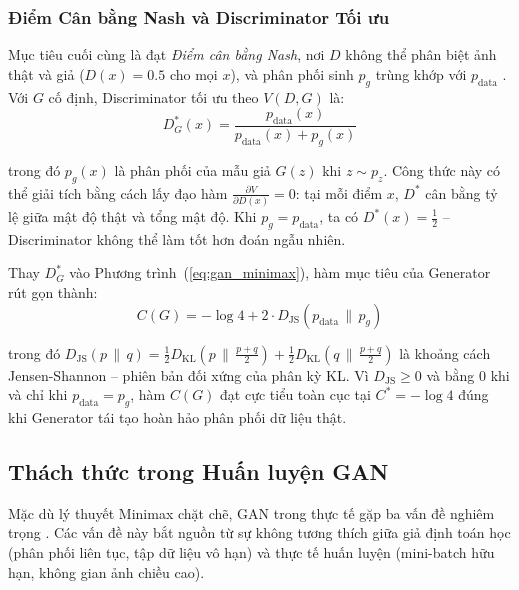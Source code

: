 \subsubsection{Điểm Cân bằng Nash và Discriminator Tối ưu}

Mục tiêu cuối cùng là đạt \textit{Điểm cân bằng Nash}, nơi $D$ không thể phân biệt ảnh thật và giả ($D(x) = 0.5$ cho mọi $x$), và phân phối sinh $p_g$ trùng khớp với $p_{\text{data}}$ \cite{Jabbar2021}. Với $G$ cố định, Discriminator tối ưu theo $V(D,G)$ là:
\begin{equation}
\label{eq:discriminator_optimal}
D^*_G(x) = \frac{p_{\text{data}}(x)}{p_{\text{data}}(x) + p_g(x)}
\end{equation}

\noindent trong đó $p_g(x)$ là phân phối của mẫu giả $G(z)$ khi $z \sim p_z$. Công thức này có thể giải tích bằng cách lấy đạo hàm $\frac{\partial V}{\partial D(x)} = 0$: tại mỗi điểm $x$, $D^*$ cân bằng tỷ lệ giữa mật độ thật và tổng mật độ. Khi $p_g = p_{\text{data}}$, ta có $D^*(x) = \tfrac{1}{2}$ -- Discriminator không thể làm tốt hơn đoán ngẫu nhiên.

Thay $D^*_G$ vào Phương trình~(\ref{eq:gan_minimax}), hàm mục tiêu của Generator rút gọn thành:
\begin{equation}
\label{eq:generator_jsd}
C(G) = -\log 4 + 2 \cdot D_{\text{JS}}(p_{\text{data}} \,\|\, p_g)
\end{equation}

\noindent trong đó $D_{\text{JS}}(p \,\|\, q) = \frac{1}{2} D_{\text{KL}}\!\left(p \,\Big\|\, \frac{p+q}{2}\right) + \frac{1}{2} D_{\text{KL}}\!\left(q \,\Big\|\, \frac{p+q}{2}\right)$ là khoảng cách Jensen-Shannon -- phiên bản đối xứng của phân kỳ KL. Vì $D_{\text{JS}} \geq 0$ và bằng 0 khi và chỉ khi $p_{\text{data}} = p_g$, hàm $C(G)$ đạt cực tiểu toàn cục tại $C^* = -\log 4$ đúng khi Generator tái tạo hoàn hảo phân phối dữ liệu thật.


\subsection{Thách thức trong Huấn luyện GAN}
\label{subsec:gan_challenges}

Mặc dù lý thuyết Minimax chặt chẽ, GAN trong thực tế gặp ba vấn đề nghiêm trọng \cite{Salimans2016, Heusel2017}. Các vấn đề này bắt nguồn từ sự không tương thích giữa giả định toán học (phân phối liên tục, tập dữ liệu vô hạn) và thực tế huấn luyện (mini-batch hữu hạn, không gian ảnh chiều cao).

